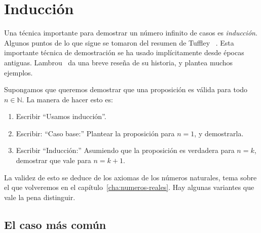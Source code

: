 \section{Inducción}
\label{sec:induccion}

  Una técnica importante para demostrar un número infinito de casos
  es \emph{inducción}.
  Algunos puntos de lo que sigue se tomaron del resumen de Tuffley~%
    \cite{tuffley09:_induction}.
  Esta importante técnica de demostración se ha usado implícitamente
  desde épocas antiguas.
  Lambrou~%
   \cite{lambrou05:_math_induction_i, lambrou06:_math_induction_ii}
  da una breve reseña de su historia,
  y plantea muchos ejemplos.

  Supongamos que queremos demostrar
  que una proposición es válida para todo \(n \in \mathbb{N}\).
  La manera de hacer esto es:
  \begin{enumerate}
  \item
    Escribir ``Usamos inducción''.
  \item
    Escribir: ``Caso base:''
    Plantear la proposición para \(n = 1\),
    y demostrarla.
  \item
    Escribir ``Inducción:''
    Asumiendo que la proposición es verdadera para \(n = k\),
    demostrar que vale para \(n = k + 1\).
  \end{enumerate}
  La validez de esto se deduce
  de los axiomas de los números naturales,
  tema sobre el que volveremos
  en el capítulo~\ref{cha:numeros-reales}\@.
  Hay algunas variantes que vale la pena distinguir.

\subsection{El caso más común}
\label{sec:induccion-comun}

